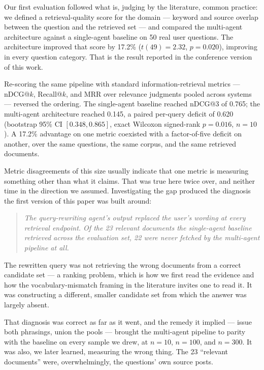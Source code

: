 \documentclass[acmsmall,review,anonymous,screen]{acmart}
\begin{document}
Our first evaluation followed what is, judging by the literature, common
practice: we defined a retrieval-quality score for the domain --- keyword and
source overlap between the question and the retrieved set --- and compared the
multi-agent architecture against a single-agent baseline on 50 real user
questions. The architecture improved that score by 17.2\% ($t(49)=2.32$,
$p=0.020$), improving in every question category. That is the result reported in
the conference version of this work.

Re-scoring the same pipeline with standard information-retrieval metrics ---
nDCG@$k$, Recall@$k$, and MRR over relevance judgments pooled across systems ---
reversed the ordering. The single-agent baseline reached nDCG@3 of 0.765; the
multi-agent architecture reached 0.145, a paired per-query deficit of 0.620
(bootstrap 95\% CI $[0.348, 0.865]$, exact Wilcoxon signed-rank $p=0.016$,
$n=10$). A 17.2\% advantage on one metric
coexisted with a factor-of-five deficit on another, over the same questions, the
same corpus, and the same retrieved documents.

Metric disagreements of this size usually indicate that one metric is measuring
something other than what it claims. That was true here twice over, and neither
time in the direction we assumed. Investigating the gap produced the diagnosis
the first version of this paper was built around:

\begin{quote}
\emph{The query-rewriting agent's output replaced the user's wording at every
retrieval endpoint. Of the 23 relevant documents the single-agent baseline
retrieved across the evaluation set, 22 were never fetched by the multi-agent
pipeline at all.}
\end{quote}

The rewritten query was not retrieving the wrong documents from a correct
candidate set --- a ranking problem, which is how we first read the evidence and
how the vocabulary-mismatch framing in the literature invites one to read it.
It was constructing a different, smaller candidate set from which the answer was
largely absent.

That diagnosis was correct as far as it went, and the remedy it implied ---
issue both phrasings, union the pools --- brought the multi-agent pipeline to
parity with the baseline on every sample we drew, at $n=10$, $n=100$, and
$n=300$. It was also, we later learned, measuring the wrong thing. The 23
``relevant documents'' were, overwhelmingly, the questions' own source posts.
\end{document}
